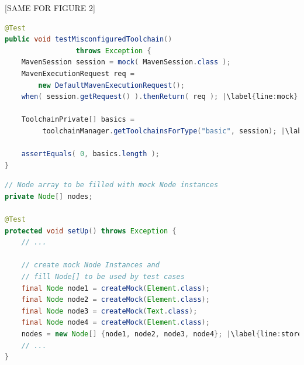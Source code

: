 [SAME FOR FIGURE 2]


\begin{lstlisting}[basicstyle=\ttfamily, caption={This code snippet illustrates an example from maven-core, where both the focal method \texttt{getToolchainsForType} and a method invocation \texttt{getRequest} on a mock object occur in test \textit{testMisconfiguredToolchain()}},
basicstyle=\scriptsize\ttfamily,language = Java, framesep=4.5mm, escapechar=|,
framexleftmargin=1.0mm, captionpos=b, xleftmargin=3.5ex, label=lis:mockCall]
@Test
public void testMisconfiguredToolchain()
                 throws Exception {
    MavenSession session = mock( MavenSession.class );
    MavenExecutionRequest req = 
        new DefaultMavenExecutionRequest();
    when( session.getRequest() ).thenReturn( req ); |\label{line:mock}|
    
    ToolchainPrivate[] basics =
         toolchainManager.getToolchainsForType("basic", session); |\label{line:real}|
    
    assertEquals( 0, basics.length );
}
\end{lstlisting}

\begin{lstlisting}[basicstyle=\ttfamily, caption={This example illustrates a field array container holding mock objects from \textit{setup()} in \texttt{NodeListIteratorTest.java}.},
basicstyle=\scriptsize\ttfamily,language = Java, framesep=4.5mm, framexleftmargin=1.0mm, captionpos=b, xleftmargin=3.5ex, label=lis:container, escapechar=|]
// Node array to be filled with mock Node instances
private Node[] nodes;

@Test
protected void setUp() throws Exception {
    // ...

    // create mock Node Instances and 
    // fill Node[] to be used by test cases
    final Node node1 = createMock(Element.class);
    final Node node2 = createMock(Element.class);
    final Node node3 = createMock(Text.class);
    final Node node4 = createMock(Element.class);
    nodes = new Node[] {node1, node2, node3, node4}; |\label{line:storeMocksInArray}|
    // ...
}
\end{lstlisting}


